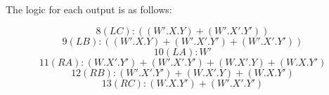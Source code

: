 \documentclass[12pt, letterpaper]{report}
\begin{document}
The logic for each output is as follows:


 

 \begin{equation}
8(LC): ((W'.X.Y)+(W'.X'.Y'))
 \end{equation}
 \begin{equation}
 9(LB): ((W'.X.Y)+(W'.X'.Y')+(W'.X'.Y'))
  \end{equation}
  \begin{equation}
10(LA): W'
   \end{equation}
   \begin{equation}
11(RA): (W.X'.Y')+(W'.X'.Y')+(W.X'.Y)+(W.X.Y')
  \end{equation}
  \begin{equation}
 12(RB): (W'.X'.Y')+(W.X'.Y)+(W.X.Y')
   \end{equation}
   \begin{equation}
 13(RC): (W.X.Y')+(W'.X'.Y')
 \end{equation}
\end{document}
